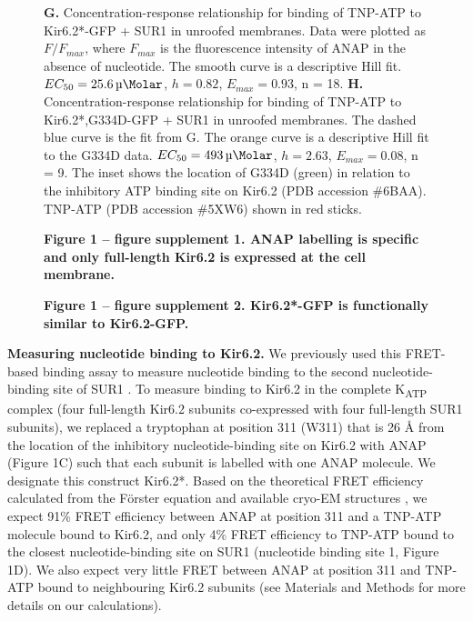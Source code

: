 \documentclass[10pt,lineno, doublespacing]{elife}
\begin{document}
\begin{figure}
\begin{fullwidth}
{\textbf{G.}
Concentration-response relationship for binding of TNP-ATP to Kir6.2*-GFP + SUR1 in unroofed membranes.
Data were plotted as $F/F_{max}$, where $F_{max}$ is the fluorescence intensity of ANAP in the absence of nucleotide.
The smooth curve is a descriptive Hill fit.
$EC_{50} = \SI{25.6}{\micro\Molar}$, $h = 0.82$, $E_{max} = 0.93$, n = 18.
\textbf{H.}
Concentration-response relationship for binding of TNP-ATP to Kir6.2*,G334D-GFP + SUR1 in unroofed membranes.
The dashed blue curve is the fit from G. The orange curve is a descriptive Hill fit to the G334D data.
$EC_{50} = \SI{493}{\micro\Molar}$, $h = 2.63$, $E_{max} = 0.08$, n = 9.
The inset shows the location of G334D (green) in relation to the inhibitory ATP binding site on Kir6.2 (PDB accession \#6BAA).
TNP-ATP (PDB accession \#5XW6) shown in red sticks.
}
\raggedright
\textbf{\small Figure 1 -- figure supplement 1. ANAP labelling is specific and only full-length Kir6.2 is expressed at the cell membrane.}

\textbf{\small Figure 1 -- figure supplement 2. Kir6.2*-GFP is functionally similar to Kir6.2-GFP.}
\end{fullwidth}
\end{figure}

\textbf{Measuring nucleotide binding to Kir6.2.}
We previously used this FRET-based binding assay to measure nucleotide binding to the second nucleotide-binding site of SUR1 \citep{RN80}.
To measure binding to Kir6.2 in the complete K\textsubscript{ATP} complex (four full-length Kir6.2 subunits co-expressed with four full-length SUR1 subunits), we replaced a tryptophan at position 311 (W311) that is 26 \si{\angstrom} from the location of the inhibitory nucleotide-binding site on Kir6.2 with ANAP (Figure 1C) such that each subunit is labelled with one ANAP molecule.
We designate this construct Kir6.2*.
Based on the theoretical FRET efficiency calculated from the Förster equation and available cryo-EM structures \citep{RN6, RN113}, we expect 91\% FRET efficiency between ANAP at position 311 and a TNP-ATP molecule bound to Kir6.2, and only 4\% FRET efficiency to TNP-ATP bound to the closest nucleotide-binding site on SUR1 (nucleotide binding site 1, Figure 1D).
We also expect very little FRET between ANAP at position 311 and TNP-ATP bound to neighbouring Kir6.2 subunits (see Materials and Methods for more details on our calculations).
\end{document}
